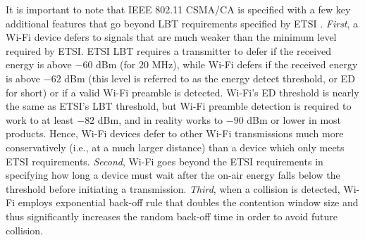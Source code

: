 It is important to note that IEEE 802.11 CSMA/CA is specified with a few key additional features that go beyond LBT requirements specified by ETSI \cite{LBT-ETSI-2014}. \textit{First}, a Wi-Fi device defers to signals that are much weaker than the minimum level required by ETSI. ETSI LBT requires a transmitter to defer if the received energy is above $-60$ dBm (for $20$ MHz), while Wi-Fi defers if the received energy is above $-62$ dBm (this level is referred to as the energy detect threshold, or ED for short) or if a valid Wi-Fi preamble is detected. Wi-Fi's ED threshold is nearly the same as ETSI's LBT threshold, but Wi-Fi preamble detection is required to work to at least $-82$ dBm, and in reality works to $-90$ dBm or lower in most products. Hence, Wi-Fi devices defer to other Wi-Fi transmissions much more conservatively (i.e., at a much larger distance) than a device which only meets ETSI requirements. \textit{Second}, Wi-Fi goes beyond the ETSI requirements in specifying how long a device must wait after the on-air energy falls below the threshold before initiating a transmission. \textit{Third}, when a collision is detected, Wi-Fi employs exponential back-off rule that doubles the contention window size and thus significantly increases the random back-off time in order to avoid future collision.

